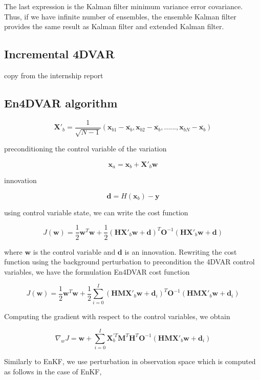 \documentclass[a4,12pt]{article}
\begin{document}
The last expression is the Kalman filter minimum variance error covariance. Thus, if we have infinite number of ensembles, the ensemble Kalman filter provides the same result as Kalman filter and extended Kalman filter.

\subsection{Incremental 4DVAR}
copy from the internship report

\subsection{En4DVAR algorithm}

$$\textbf{X}'_{b}=\frac{1}{\sqrt{N-1}}(\textbf{x}_{b1}-\overline{\textbf{x}_{b}},\textbf{x}_{b2}-\overline{\textbf{x}_{b}},......,\textbf{x}_{bN}-\overline{\textbf{x}_{b}})$$

preconditioning the control variable of the variation

$$\textbf{x}_{a} = \textbf{x}_{b} + \textbf{X}'_{b}\textbf{w}$$

innovation

$$\textbf{d} = H(\textbf{x}_{b})-\textbf{y}$$

using control variable state, we can write the cost function

$$J(\textbf{w}) = \frac{1}{2} \textbf{w}^{T}\textbf{w} + \frac{1}{2}(\textbf{H}\textbf{X}'_{b}\textbf{w}+\textbf{d})^{T}\textbf{O}^{-1}(\textbf{H}\textbf{X}'_{b}\textbf{w}+\textbf{d})$$

where $\textbf{w}$ is the control variable and $\textbf{d}$ is an innovation. Rewriting the cost function using the background perturbation to precondition the 4DVAR control variables, we have the formulation En4DVAR cost function

$$J(\textbf{w}) = \frac{1}{2} \textbf{w}^{T}\textbf{w} + \frac{1}{2}\sum_{i=0}^{I}(\textbf{HM}\textbf{X}'_{b}\textbf{w} + \textbf{d}_{i})^{T}\textbf{O}^{-1}(\textbf{HMX}'_{b}\textbf{w}+\textbf{d}_{i})$$

Computing the gradient with respect to the control variables, we obtain

$$\nabla_{w}J = \textbf{w} + \sum_{i=0}^{I} \textbf{X}_{b}^{'T}\textbf{M}^{T}\textbf{H}^{T}\textbf{O}^{-1}(\textbf{HMX}'_{b}\textbf{w}+\textbf{d}_{i})$$

Similarly to EnKF, we use perturbation in observation space which is computed as follows in the case of EnKF,
\end{document}

